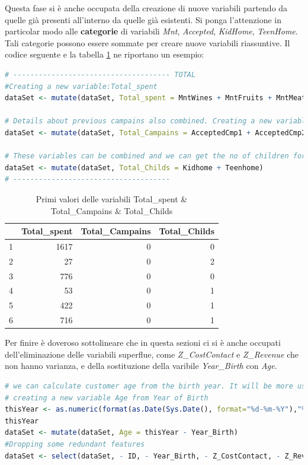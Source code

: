 \documentclass[letterpaper,11pt]{article}
\begin{document}
Questa fase si è anche occupata della creazione di nuove variabili partendo da quelle già presenti all'interno da quelle già esistenti. Si ponga l'attenzione in particolar modo alle \textbf{categorie} di variabili \textit{Mnt}, \textit{Accepted}, \textit{KidHome}, \textit{TeenHome}. Tali categorie possono essere sommate per creare nuove variabili riassuntive. Il codice seguente e la tabella \ref{fig:Totalspent&TotalCampains&TotalChilds} ne riportano un esempio:
\begin{lstlisting}[language=R]
# ------------------------------------- TOTAL
#Creating a new variable:Total_spent
dataSet <- mutate(dataSet, Total_spent = MntWines + MntFruits + MntMeatProducts + MntFishProducts + MntSweetProducts + MntGoldProds)

# Details about previous campains also combined. Creating a new variable:Total_Campains
dataSet <- mutate(dataSet, Total_Campains = AcceptedCmp1 + AcceptedCmp2 + AcceptedCmp3 + AcceptedCmp4 + AcceptedCmp5)

# These variables can be combined and we can get the no of children for the dataSet. Creating a new variable:Total_Childs
dataSet <- mutate(dataSet, Total_Childs = Kidhome + Teenhome)
# ------------------------------------- 
\end{lstlisting}
\begin{table}[H]
\centering
\begin{tabular}{rrrr}
  \hline
 & Total\_spent & Total\_Campains & Total\_Childs \\ 
  \hline
1 & 1617 &   0 &   0 \\ 
  2 &  27 &   0 &   2 \\ 
  3 & 776 &   0 &   0 \\ 
  4 &  53 &   0 &   1 \\ 
  5 & 422 &   0 &   1 \\ 
  6 & 716 &   0 &   1 \\ 
   \hline
\end{tabular}
\caption{Primi valori delle variabili Total\_spent \& Total\_Campains \& Total\_Childs}
\label{fig:Totalspent&TotalCampains&TotalChilds}
\end{table}

Per finire è doveroso sottolineare che in questa sezioni ci si è anche occupati dell'eliminazione delle variabili superflue, come \textit{Z\_CostContact} e \textit{Z\_Revenue} che non hanno varianza, e della sostituzione della varibile \textit{Year\_Birth} con \textit{Age}.
\begin{lstlisting}[language=R]
# we can calculate customer age from the birth year. It will be more usefull to our analysis.
# creating a new variable Age from Year of Birth 
thisYear <- as.numeric(format(as.Date(Sys.Date(), format="%d-%m-%Y"),"%Y"))
thisYear
dataSet <- mutate(dataSet, Age = thisYear - Year_Birth)
#Dropping some redundant features
dataSet <- select(dataSet, - ID, - Year_Birth, - Z_CostContact, - Z_Revenue, -Dt_Customer)
\end{lstlisting}
\end{document}
